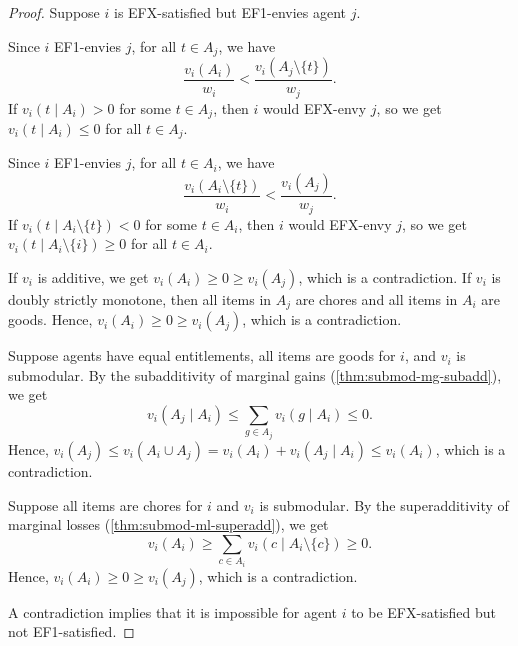 \begin{proof}
Suppose $i$ is EFX-satisfied but EF1-envies agent $j$.

Since $i$ EF1-envies $j$, for all $t \in A_j$, we have
\[ \frac{v_i(A_i)}{w_i} < \frac{v_i(A_j \setminus \{t\})}{w_j}. \]
If $v_i(t \mid A_i) > 0$ for some $t \in A_j$, then $i$ would EFX-envy $j$,
so we get $v_i(t \mid A_i) \le 0$ for all $t \in A_j$.

Since $i$ EF1-envies $j$, for all $t \in A_i$, we have
\[ \frac{v_i(A_i \setminus \{t\})}{w_i} < \frac{v_i(A_j)}{w_j}. \]
If $v_i(t \mid A_i \setminus \{t\}) < 0$ for some $t \in A_i$, then $i$ would EFX-envy $j$,
so we get $v_i(t \mid A_i \setminus \{i\}) \ge 0$ for all $t \in A_i$.

If $v_i$ is additive, we get $v_i(A_i) \ge 0 \ge v_i(A_j)$, which is a contradiction.
%
If $v_i$ is doubly strictly monotone, then
all items in $A_j$ are chores and all items in $A_i$ are goods.
Hence, $v_i(A_i) \ge 0 \ge v_i(A_j)$, which is a contradiction.

Suppose agents have equal entitlements, all items are goods for $i$, and $v_i$ is submodular.
By the subadditivity of marginal gains (\cref{thm:submod-mg-subadd}), we get
\[ v_i(A_j \mid A_i) \le \sum_{g \in A_j} v_i(g \mid A_i) \le 0. \]
Hence, $v_i(A_j) \le v_i(A_i \cup A_j) = v_i(A_i) + v_i(A_j \mid A_i) \le v_i(A_i)$,
which is a contradiction.

Suppose all items are chores for $i$ and $v_i$ is submodular.
By the superadditivity of marginal losses (\cref{thm:submod-ml-superadd}), we get
\[ v_i(A_i) \ge \sum_{c \in A_i} v_i(c \mid A_i \setminus \{c\}) \ge 0. \]
Hence, $v_i(A_i) \ge 0 \ge v_i(A_j)$, which is a contradiction.

A contradiction implies that it is impossible for agent $i$ to be
EFX-satisfied but not EF1-satisfied.
\end{proof}


